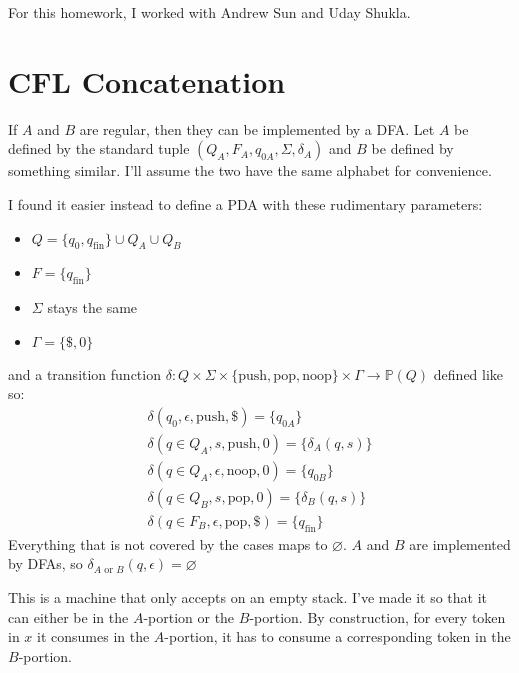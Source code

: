 \documentclass[12pt]{article}
\begin{document}
\hspace{0pt}
\vfill
\begin{center}
    For this homework, I worked with Andrew Sun and Uday Shukla.
\end{center}
\vfill
\hspace{0pt}

\pagebreak

\section{CFL Concatenation}

If $A$ and $B$ are regular, then they can be implemented by a DFA.
Let $A$ be defined by the standard tuple $(Q_A, F_A, q_{0A}, \Sigma, \delta_A)$
and $B$ be defined by something similar.
I'll assume the two have the same alphabet for convenience.

I found it easier instead to define a PDA with these rudimentary parameters:
\begin{itemize}
    \item $Q=\{q_0, q_{\text{fin}}\} \cup Q_A \cup Q_B$
    \item $F=\{q_{\text{fin}}\}$
    \item $\Sigma$ stays the same
    \item $\Gamma=\{\$, 0\}$
\end{itemize}
and a transition function
$\delta: Q \times \Sigma \times \{\text{push}, \text{pop}, \text{noop}\} \times \Gamma \rightarrow \mathbb{P}(Q)$
defined like so:
\begin{gather*}
    \delta(q_0, \epsilon, \text{push}, \$)=\{q_{0A}\} \\
    \delta(q \in Q_A, s, \text{push}, 0)=\{\delta_A(q, s)\} \\
    \delta(q \in Q_A, \epsilon, \text{noop}, 0)=\{q_{0B}\} \\
    \delta(q \in Q_B, s, \text{pop}, 0)=\{\delta_B(q, s)\} \\
    \delta(q \in F_B, \epsilon, \text{pop}, \$)=\{q_{\text{fin}}\}
\end{gather*}
Everything that is not covered by the cases maps to $\varnothing$.
$A$ and $B$ are implemented by DFAs, so $\delta_{A\text{ or }B}(q, \epsilon)=\varnothing$

This is a machine that only accepts on an empty stack.
I've made it so that it can either be in the $A$-portion or the $B$-portion.
By construction, for every token in $x$ it consumes in the $A$-portion,
it has to consume a corresponding token in the $B$-portion.
\end{document}
